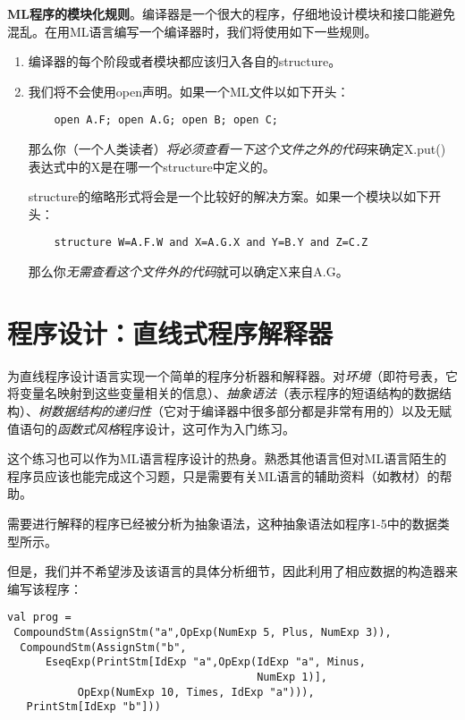 \documentclass[cn,11pt,chinese]{elegantbook}
\begin{document}
\textbf{ML程序的模块化规则}。编译器是一个很大的程序，仔细地设计模块和接口能避免混乱。在用ML语言编写一个编译器时，我们将使用如下一些规则。

\begin{enumerate}
  \item 编译器的每个阶段或者模块都应该归入各自的structure。
  \item 我们将不会使用open声明。如果一个ML文件以如下开头：
  \begin{verbatim}
    open A.F; open A.G; open B; open C;
  \end{verbatim}
  那么你（一个人类读者）\textit{将必须查看一下这个文件之外的代码}来确定X.put()表达式中的X是在哪一个structure中定义的。

  structure的缩略形式将会是一个比较好的解决方案。如果一个模块以如下开头：
  \begin{verbatim}
    structure W=A.F.W and X=A.G.X and Y=B.Y and Z=C.Z
  \end{verbatim}
  那么你\textit{无需查看这个文件外的代码}就可以确定X来自A.G。
\end{enumerate}

\section{程序设计：直线式程序解释器}

为直线程序设计语言实现一个简单的程序分析器和解释器。对\textit{环境}（即符号表，它将变量名映射到这些变量相关的信息）、\textit{抽象语法}（表示程序的短语结构的数据结构）、\textit{树数据结构的递归性}（它对于编译器中很多部分都是非常有用的）以及无赋值语句的\textit{函数式风格}程序设计，这可作为入门练习。

这个练习也可以作为ML语言程序设计的热身。熟悉其他语言但对ML语言陌生的程序员应该也能完成这个习题，只是需要有关ML语言的辅助资料（如教材）的帮助。

需要进行解释的程序已经被分析为抽象语法，这种抽象语法如程序1-5中的数据类型所示。

但是，我们并不希望涉及该语言的具体分析细节，因此利用了相应数据的构造器来编写该程序：

\begin{verbatim}
val prog =
 CompoundStm(AssignStm("a",OpExp(NumExp 5, Plus, NumExp 3)),
  CompoundStm(AssignStm("b",
      EseqExp(PrintStm[IdExp "a",OpExp(IdExp "a", Minus,
                                       NumExp 1)],
           OpExp(NumExp 10, Times, IdExp "a"))),
   PrintStm[IdExp "b"]))
\end{verbatim}
\end{document}
